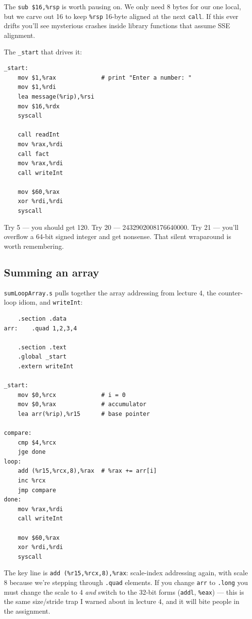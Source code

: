 \documentclass[11pt]{article}
\begin{document}
The \texttt{sub \$16,\%rsp} is worth pausing on. We only need 8 bytes
for our one local, but we carve out 16 to keep \texttt{\%rsp} 16-byte
aligned at the next \texttt{call}. If this ever drifts you'll see
mysterious crashes inside library functions that assume SSE
alignment.

The \texttt{\_start} that drives it:

\begin{lstlisting}
_start:
    mov $1,%rax             # print "Enter a number: "
    mov $1,%rdi
    lea message(%rip),%rsi
    mov $16,%rdx
    syscall

    call readInt
    mov %rax,%rdi
    call fact
    mov %rax,%rdi
    call writeInt

    mov $60,%rax
    xor %rdi,%rdi
    syscall
\end{lstlisting}

Try 5 --- you should get 120. Try 20 --- 2432902008176640000. Try 21
--- you'll overflow a 64-bit signed integer and get nonsense. That
silent wraparound is worth remembering.

\subsection*{Summing an array}

\texttt{sumLoopArray.s} pulls together the array addressing from
lecture 4, the counter-loop idiom, and \texttt{writeInt}:

\begin{lstlisting}
    .section .data
arr:    .quad 1,2,3,4

    .section .text
    .global _start
    .extern writeInt

_start:
    mov $0,%rcx             # i = 0
    mov $0,%rax             # accumulator
    lea arr(%rip),%r15      # base pointer

compare:
    cmp $4,%rcx
    jge done
loop:
    add (%r15,%rcx,8),%rax  # %rax += arr[i]
    inc %rcx
    jmp compare
done:
    mov %rax,%rdi
    call writeInt

    mov $60,%rax
    xor %rdi,%rdi
    syscall
\end{lstlisting}

The key line is \texttt{add (\%r15,\%rcx,8),\%rax}: scale-index
addressing again, with scale 8 because we're stepping through
\texttt{.quad} elements. If you change \texttt{arr} to \texttt{.long}
you must change the scale to 4 \emph{and} switch to the 32-bit
forms (\texttt{addl}, \texttt{\%eax}) --- this is the same
size/stride trap I warned about in lecture 4, and it will bite people
in the assignment.
\end{document}
